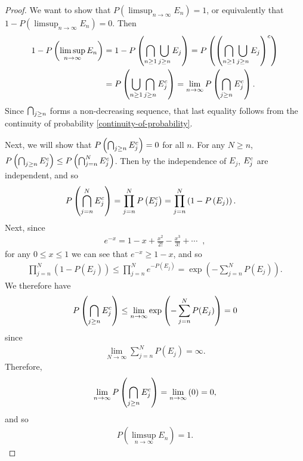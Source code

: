 \begin{proof}
    We want to show that $P\left(\limsup_{n \to \infty}E_n\right) = 1$, or equivalently that $1 - P\left(\limsup_{n \to \infty}E_n\right) = 0$. Then
    \begin{align*}
        1 - P\left(\limsup_{n \to \infty}E_n\right) &= 1 - P\left(\bigcap_{n \geq 1}\bigcup_{j \geq n}E_j\right) = P\left(\left(\bigcap_{n \geq 1}\bigcup_{j \geq n}E_j\right)^{c}\right) \\
        &= P\left(\bigcup_{n \geq 1}\bigcap_{j \geq n}E_j^{c}\right) = \lim_{n\to\infty}P\left(\bigcap_{j \geq n}E_j^{c}\right).
    \end{align*}
    Since $\bigcap_{j \geq n}$ forms a non-decreasing sequence, that last equality follows from the continuity of probability \ref{continuity-of-probability}.
    
    Next, we will show that $P\left(\bigcap_{j \geq n}E_j^{c}\right) = 0$ for all $n$. For any $N \geq n$, $P\left(\bigcap_{j \geq n}E_j^{c}\right) \leq P\left(\bigcap_{j=n}^{N}E_j^{c}\right)$. Then by the independence of $E_j$, $E_j^{c}$ are independent, and so
    \begin{align*}
        P\left(\bigcap_{j=n}^{N}E_j^{c}\right) &= \prod_{j=n}^{N}P\left(E_j^{c}\right) = \prod_{j=n}^{N}\left(1 - P\left(E_j\right)\right).
    \end{align*}
    Next, since
    \begin{align*}
        e^{-x} = 1 - x + \frac{x^2}{2!} - \frac{x^3}{3!} + \cdots\;\;,
    \end{align*}
    for any $0 \leq x \leq 1$ we can see that $e^{-x} \geq 1 - x$, and so
    \begin{align*}
        \prod_{j=n}^{N}\left(1 - P\left(E_j\right)\right) \leq \prod_{j=n}^{N}e^{-P\left(E_j\right)} = \exp\left(-\sum_{j=n}^{N}P(E_j)\right).
    \end{align*}
    We therefore have
    \begin{align*}
        P\left(\bigcap_{j \geq n}E_j^{c}\right) \leq \lim_{n\to\infty}\exp\left(-\sum_{j=n}^{N}P(E_j)\right) = 0
    \end{align*}
    since
    \begin{align*}
        \lim_{N\to\infty}\sum_{j=n}^{N}P(E_j) = \infty.
    \end{align*}
    Therefore,
    \begin{align*}
        \lim_{n\to\infty}P\left(\bigcap_{j \geq n}E_j^{c}\right) = \lim_{n\to\infty}\left(0\right) = 0,
    \end{align*}
    and so
    \begin{align*}
        P\left(\limsup_{n \to \infty}E_n\right) = 1.
    \end{align*}
\end{proof}

